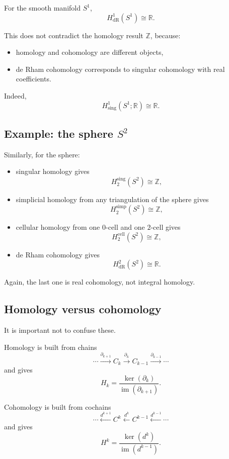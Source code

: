 \documentclass[12pt,a4paper]{article}
\theoremstyle{notespace}
\begin{document}
For the smooth manifold \(S^1\),
\[
H^1_{\mathrm{dR}}(S^1)\cong \mathbb R.
\]

This does not contradict the homology result \(\mathbb Z\), because:

\begin{itemize}
	\item homology and cohomology are different objects,
	\item de Rham cohomology corresponds to singular cohomology with real coefficients.
\end{itemize}

Indeed,
\[
H^1_{\mathrm{sing}}(S^1;\mathbb R)\cong \mathbb R.
\]

\subsection{ Example: the sphere \texorpdfstring{$S^2$}{S2}}

Similarly, for the sphere:

\begin{itemize}
	\item singular homology gives
	\[
	H_2^{\mathrm{sing}}(S^2)\cong \mathbb Z,
	\]
	\item simplicial homology from any triangulation of the sphere gives
	\[
	H_2^{\mathrm{simp}}(S^2)\cong \mathbb Z,
	\]
	\item cellular homology from one \(0\)-cell and one \(2\)-cell gives
	\[
	H_2^{\mathrm{cell}}(S^2)\cong \mathbb Z,
	\]
	\item de Rham cohomology gives
	\[
	H^2_{\mathrm{dR}}(S^2)\cong \mathbb R.
	\]
\end{itemize}

Again, the last one is real cohomology, not integral homology.

\subsection{ Homology versus cohomology}

It is important not to confuse these.

Homology is built from chains
\[
\cdots \xrightarrow{\partial_{k+1}} C_k \xrightarrow{\partial_k} C_{k-1}\xrightarrow{\partial_{k-1}}\cdots
\]
and gives
\[
H_k=\frac{\ker(\partial_k)}{\operatorname{im}(\partial_{k+1})}.
\]

Cohomology is built from cochains
\[
\cdots \xleftarrow{d^{k+1}} C^k \xleftarrow{d^k} C^{k-1}\xleftarrow{d^{k-1}}\cdots
\]
and gives
\[
H^k=\frac{\ker(d^k)}{\operatorname{im}(d^{k-1})}.
\]
\end{document}
